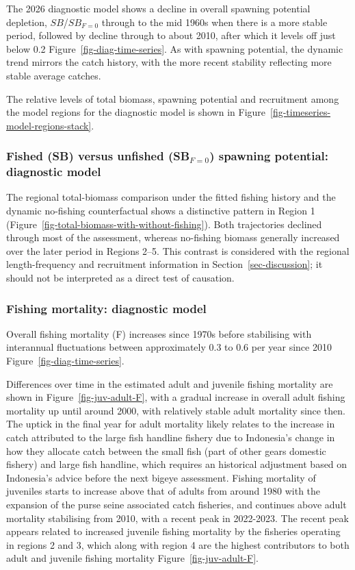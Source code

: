 \documentclass[
  english,
  a4paper,
  a4paper,
  11pt]{SCreport}
\begin{document}
The 2026 diagnostic model shows a decline in overall spawning potential
depletion, \(SB\)/\(SB_{F=0}\) through to the mid 1960s when there is a
more stable period, followed by decline through to about 2010, after
which it levels off just below 0.2 Figure~\ref{fig-diag-time-series}. As
with spawning potential, the dynamic trend mirrors the catch history,
with the more recent stability reflecting more stable average catches.

The relative levels of total biomass, spawning potential and recruitment
among the model regions for the diagnostic model is shown in
Figure~\ref{fig-timeseries-model-regions-stack}.

\subsubsection{\texorpdfstring{Fished (SB) versus unfished
(SB\(_{F=0}\)) spawning potential: diagnostic
model}{Fished (SB) versus unfished (SB\_\{F=0\}) spawning potential: diagnostic model}}\label{sec-fished-unfished-diag}

The regional total-biomass comparison under the fitted fishing history
and the dynamic no-fishing counterfactual shows a distinctive pattern in
Region 1 (Figure~\ref{fig-total-biomass-with-without-fishing}). Both
trajectories declined through most of the assessment, whereas no-fishing
biomass generally increased over the later period in Regions 2--5. This
contrast is considered with the regional length-frequency and
recruitment information in Section~\ref{sec-discussion}; it should not
be interpreted as a direct test of causation.

\subsubsection{Fishing mortality: diagnostic
model}\label{sec-fish-mortality-diag}

Overall fishing mortality (F) increases since 1970s before stabilising
with interannual fluctuations between approximately 0.3 to 0.6 per year
since 2010 Figure~\ref{fig-diag-time-series}.

Differences over time in the estimated adult and juvenile fishing
mortality are shown in Figure~\ref{fig-juv-adult-F}, with a gradual
increase in overall adult fishing mortality up until around 2000, with
relatively stable adult mortality since then. The uptick in the final
year for adult mortality likely relates to the increase in catch
attributed to the large fish handline fishery due to Indonesia's change
in how they allocate catch between the small fish (part of other gears
domestic fishery) and large fish handline, which requires an historical
adjustment based on Indonesia's advice before the next bigeye
assessment. Fishing mortality of juveniles starts to increase above that
of adults from around 1980 with the expansion of the purse seine
associated catch fisheries, and continues above adult mortality
stabilising from 2010, with a recent peak in 2022-2023. The recent peak
appears related to increased juvenile fishing mortality by the fisheries
operating in regions 2 and 3, which along with region 4 are the highest
contributors to both adult and juvenile fishing mortality
Figure~\ref{fig-juv-adult-F}.
\end{document}
